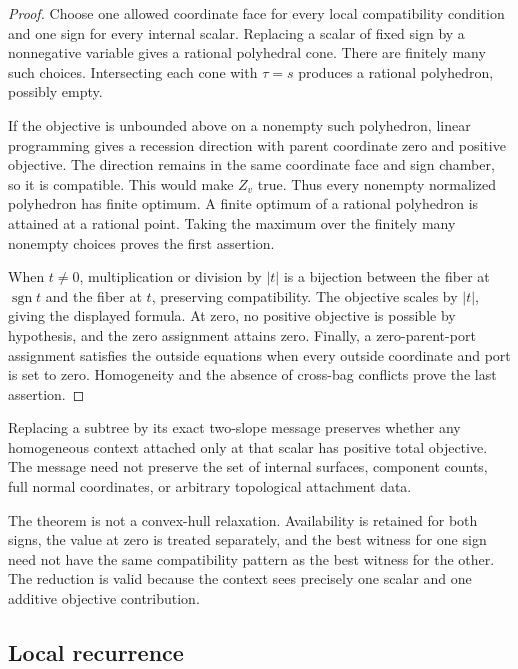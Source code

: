 \begin{proof}
Choose one allowed coordinate face for every local compatibility condition and
one sign for every internal scalar. Replacing a scalar of fixed sign by a
nonnegative variable gives a rational polyhedral cone. There are finitely many
such choices. Intersecting each cone with $\tau=s$ produces a rational
polyhedron, possibly empty.

If the objective is unbounded above on a nonempty such polyhedron, linear
programming gives a recession direction with parent coordinate zero and
positive objective. The direction remains in the same coordinate face and
sign chamber, so it is compatible. This would make $Z_v$ true. Thus every
nonempty normalized polyhedron has finite optimum. A finite optimum of a
rational polyhedron is attained at a rational point. Taking the maximum over
the finitely many nonempty choices proves the first assertion.

When $t\ne0$, multiplication or division by $|t|$ is a bijection between the
fiber at $\operatorname{sgn}t$ and the fiber at $t$, preserving compatibility.
The objective scales by $|t|$, giving the displayed formula. At zero, no
positive objective is possible by hypothesis, and the zero assignment attains
zero. Finally, a zero-parent-port assignment satisfies the outside equations
when every outside coordinate and port is set to zero. Homogeneity and the
absence of cross-bag conflicts prove the last assertion.
\end{proof}

\begin{corollary}
Replacing a subtree by its exact two-slope message preserves whether any
homogeneous context attached only at that scalar has positive total objective.
The message need not preserve the set of internal surfaces, component counts,
full normal coordinates, or arbitrary topological attachment data.
\end{corollary}

The theorem is not a convex-hull relaxation. Availability is retained for both
signs, the value at zero is treated separately, and the best witness for one
sign need not have the same compatibility pattern as the best witness for the
other. The reduction is valid because the context sees precisely one scalar
and one additive objective contribution.

\subsection{Local recurrence}

